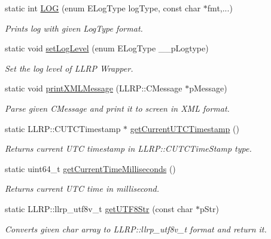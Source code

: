 \begin{DoxyCompactItemize}
\item 
static int \hyperlink{class_e_l_f_i_n_1_1_utils_a3c791ae458bce5e26979093f39575896}{L\-O\-G} (enum E\-Log\-Type log\-Type, const char $\ast$fmt,...)
\begin{DoxyCompactList}\small\item\em Prints log with given Log\-Type format. \end{DoxyCompactList}\item 
static void \hyperlink{class_e_l_f_i_n_1_1_utils_a8718299422d3ee447662ea401fbe2328}{set\-Log\-Level} (enum E\-Log\-Type \-\_\-\-\_\-p\-Logtype)
\begin{DoxyCompactList}\small\item\em Set the log level of L\-L\-R\-P Wrapper. \end{DoxyCompactList}\item 
static void \hyperlink{class_e_l_f_i_n_1_1_utils_a7fd97d47741c9fe1891a0bed66c08437}{print\-X\-M\-L\-Message} (L\-L\-R\-P\-::\-C\-Message $\ast$p\-Message)
\begin{DoxyCompactList}\small\item\em Parse given C\-Message and print it to screen in X\-M\-L format. \end{DoxyCompactList}\item 
static L\-L\-R\-P\-::\-C\-U\-T\-C\-Timestamp $\ast$ \hyperlink{class_e_l_f_i_n_1_1_utils_a9c277422b971281470b8a5080c5e646d}{get\-Current\-U\-T\-C\-Timestamp} ()
\begin{DoxyCompactList}\small\item\em Returns current U\-T\-C timestamp in L\-L\-R\-P\-::\-C\-U\-T\-C\-Time\-Stamp type. \end{DoxyCompactList}\item 
static uint64\-\_\-t \hyperlink{class_e_l_f_i_n_1_1_utils_abd2dc80c4ccc680a9879340dacac8d6a}{get\-Current\-Time\-Milliseconds} ()
\begin{DoxyCompactList}\small\item\em Returns current U\-T\-C time in millisecond. \end{DoxyCompactList}\item 
static L\-L\-R\-P\-::llrp\-\_\-utf8v\-\_\-t \hyperlink{class_e_l_f_i_n_1_1_utils_a6a0ad11177ab102ab2ce435a5232ecc2}{get\-U\-T\-F8\-Str} (const char $\ast$p\-Str)
\begin{DoxyCompactList}\small\item\em Converts given char array to L\-L\-R\-P\-::llrp\-\_\-utf8v\-\_\-t format and return it. \end{DoxyCompactList}\end{DoxyCompactItemize}

